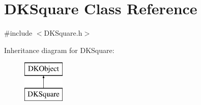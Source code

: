 \hypertarget{class_d_k_square}{\section{D\-K\-Square Class Reference}
\label{class_d_k_square}
}


{\ttfamily \#include $<$D\-K\-Square.\-h$>$}

Inheritance diagram for D\-K\-Square\-:\begin{figure}[H]
\begin{center}
\leavevmode
\includegraphics[height=2.000000cm]{class_d_k_square}
\end{center}
\end{figure}
